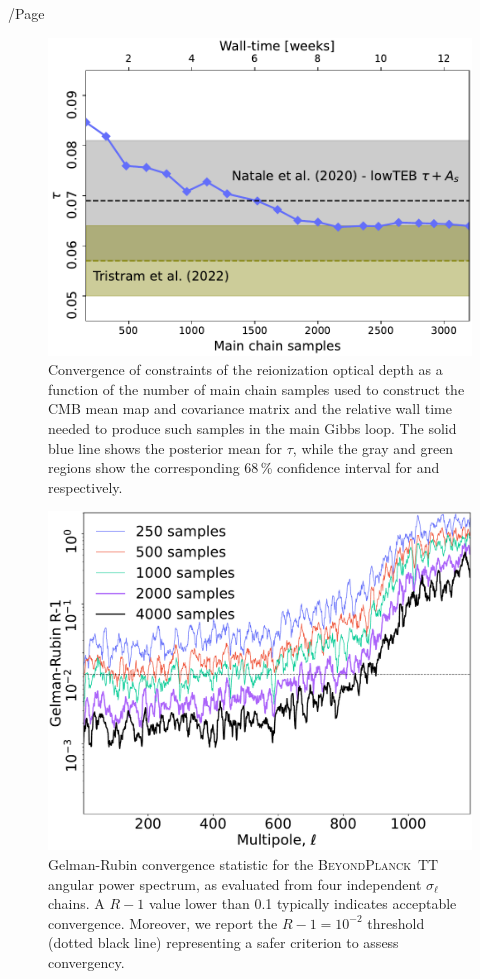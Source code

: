 /Page\documentclass[twocolumn]{aa}
\newcommand{\BP}{\textsc{BeyondPlanck}}
\begin{document}
\begin{figure}[t]
  \center
  \includegraphics[width=\linewidth]{figs/BP10_lowl_tau_R18_Tbp10_burnin200s_regP05.pdf}
  \caption{Convergence of constraints of the reionization optical depth as 
    a function of the number of main chain samples used to
    construct the CMB mean map and covariance matrix and the relative wall time needed
    to produce such samples in the main Gibbs loop. 
    The solid blue line shows the posterior mean for $\tau$, while the gray and green 
    regions show the corresponding 68\,\% confidence interval for \citet{natale:2020} and \citet{tristram:2021} respectively.}
    \label{fig:convergence}
\end{figure}

\begin{figure}[t]
  \center
  \includegraphics[width=\linewidth]{figs/sigmal_GR.pdf}
  \caption{Gelman-Rubin convergence statistic for the \BP\ $\mathrm{TT}$
    angular power spectrum, as evaluated from four independent
    $\sigma_{\ell}$ chains. A $R-1$ value lower than 0.1 
    typically indicates
    acceptable convergence. Moreover, we report the $R-1=10^{-2}$ 
    threshold (dotted black line)
    representing a safer criterion to assess convergency.}
    \label{fig:gr_TT}
\end{figure}
\end{document}
